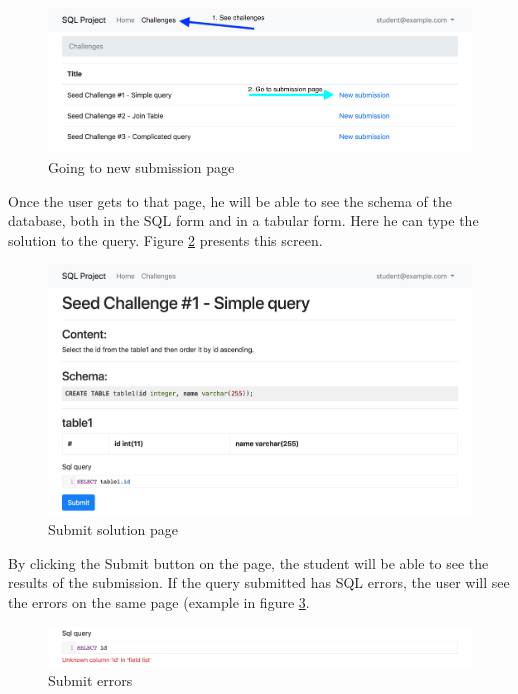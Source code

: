 \begin{figure}[ht]
    \centering
    \includegraphics[width=\textwidth/4*3]{Appendices/challengeinde.png}
    \caption{Going to new submission page}
    \label{fig:app:new_submission}
\end{figure}

Once the user gets to that page, he will be able to see the schema of the database, both in the SQL form and in a tabular form. Here he can type the solution to the query. Figure \ref{fig:app:submit} presents this screen.

\begin{figure}[ht]
    \centering
    \includegraphics[width=\textwidth/4*3]{Appendices/submit.png}
    \caption{Submit solution page}
    \label{fig:app:submit}
\end{figure}

By clicking the Submit button on the page, the student will be able to see the results of the submission. If the query submitted has SQL errors, the user will see the errors on the same page (example in figure \ref{fig:app:submit_errors}.

\begin{figure}
    \centering
    \includegraphics[width=\textwidth/4*3]{Appendices/submit_errors.png}
    \caption{Submit errors}
    \label{fig:app:submit_errors}
\end{figure}

